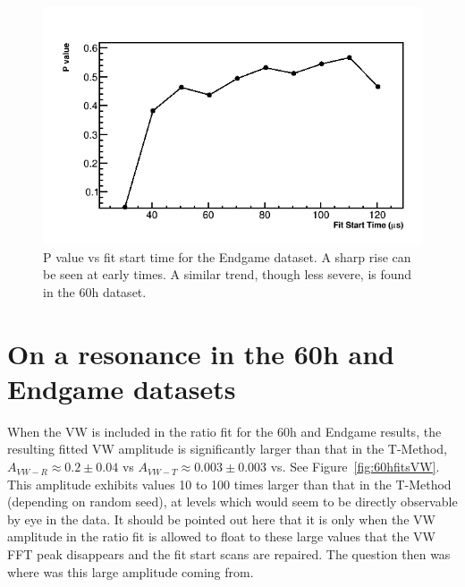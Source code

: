 \documentclass[12pt,letterpaper]{article}
\newcommand{\figref}[1]{Figure~\ref{#1}}
\begin{document}
\begin{figure}[]
    \centering
    \includegraphics[width=.5\textwidth]{Pvalue_Endgame_noRand}
    \caption[]{P value vs fit start time for the Endgame dataset. A sharp rise can be seen at early times. A similar trend, though less severe, is found in the 60h dataset.}
    \label{fig:Pvalue_Endgame}
\end{figure}

\clearpage

\section{On a resonance in the 60h and Endgame datasets}

When the VW is included in the ratio fit for the 60h and Endgame results, the resulting fitted VW amplitude is significantly larger than that in the T-Method, $A_{VW-R} \approx 0.2 \pm 0.04$ vs $A_{VW-T} \approx 0.003 \pm 0.003$ vs. See \figref{fig:60hfitsVW}. This amplitude exhibits values 10 to 100 times larger than that in the T-Method (depending on random seed), at levels which would seem to be directly observable by eye in the data. It should be pointed out here that it is only when the VW amplitude in the ratio fit is allowed to float to these large values that the VW FFT peak disappears and the fit start scans are repaired. The question then was where was this large amplitude coming from.
\end{document}
